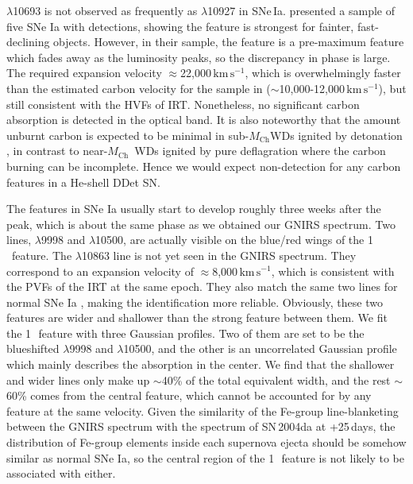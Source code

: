 \documentclass[twocolumn]{aastex631}
\newcommand{\Mch}{$M_\mathrm{Ch}$}
\newcommand{\kms}{$\mathrm{km}\,\mathrm{s}^{-1}$}
\begin{document}
 $\lambda$10693 is not observed as frequently as  $\lambda$10927 in SNe\,Ia. \citet{Hsiao_CSP_2019} presented a sample of five SNe Ia with  detections, showing the  feature is strongest for fainter, fast-declining objects. However, in their sample, the  feature is a pre-maximum feature which fades away as the luminosity peaks, so the discrepancy in phase is large. The required expansion velocity $\approx$22,000\,\kms, which is overwhelmingly faster than the estimated carbon velocity for the sample in \citet{Hsiao_CSP_2019} ($\sim$10,000-12,000\,\kms), but still consistent with the HVFs of  IRT. Nonetheless, no significant carbon absorption is detected in the optical band. It is also noteworthy that the amount unburnt carbon is expected to be minimal in sub-\Mch WDs ignited by detonation \citep{polin_observational_2019}, in contrast to near-\Mch\ WDs ignited by pure deflagration where the carbon burning can be incomplete. Hence we would expect non-detection for any carbon features in a He-shell DDet SN.

The  features in SNe Ia usually start to develop roughly three weeks after the peak, which is about the same phase as we obtained our GNIRS spectrum. Two  lines, $\lambda$9998 and $\lambda$10500, are actually visible on the blue/red wings of the 1\,\micron\ feature. The  $\lambda$10863 line is not yet seen in the GNIRS spectrum. They correspond to an expansion velocity of $\approx$8,000\,\kms, which is consistent with the PVFs of the  IRT at the same epoch. They also match the same two lines for normal SNe Ia \citep{Marion2009_NIR}, making the identification more reliable. Obviously, these two  features are wider and shallower than the strong feature between them. We fit the 1\,\micron\ feature with three Gaussian profiles. Two of them are set to be the blueshifted  $\lambda$9998 and $\lambda$10500, and the other is an uncorrelated Gaussian profile which mainly describes the absorption in the center. We find that the shallower and wider  lines only make up $\sim$40\% of the total equivalent width, and the rest $\sim$60\% comes from the central feature, which cannot be accounted for by any  feature at the same velocity. Given the similarity of the Fe-group line-blanketing between the GNIRS spectrum with the spectrum of SN\,2004da at +25\,days, the distribution of Fe-group elements inside each supernova ejecta should be somehow similar as normal SNe Ia, so the central region of the 1\,\micron\ feature is not likely to be associated with  either.
\end{document}
